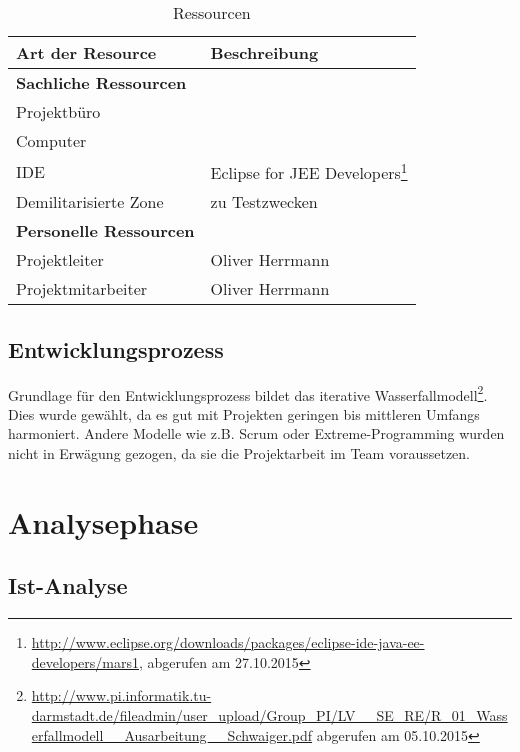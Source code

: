 \documentclass[12pt, xcolor=dvipsnames]{scrartcl}
\begin{document}
\begin{savenotes}
\begin{table}[H]
	\centering
	\begin{tabular}{ll}

		\rowcolor{white!15}				
		\textbf{Art der Resource} & \textbf{Beschreibung} \\\hline		
		
		\rowcolor{MidnightBlue!25}				
		\textbf{Sachliche Ressourcen} & \\
		Projektbüro & \\
		Computer & \\
		\hspace{1.5em} IDE & Eclipse for JEE Developers\footnote{\url{http://www.eclipse.org/downloads/packages/eclipse-ide-java-ee-developers/mars1}, abgerufen am 27.10.2015} \\
		Demilitarisierte Zone & zu Testzwecken \\
		
		\rowcolor{MidnightBlue!25}			
		\textbf{Personelle Ressourcen} & \\
		Projektleiter & Oliver Herrmann \\
		Projektmitarbeiter & Oliver Herrmann \\
	
			    
	\end{tabular}
	\caption{Ressourcen}
	\label{tab:ressourcen}
\end{table}
\end{savenotes}

\subsection{Entwicklungsprozess}

Grundlage für den Entwicklungsprozess bildet das iterative
Wasserfallmodell\footnote{\url{http://www.pi.informatik.tu-darmstadt.de/fileadmin/user_upload/Group_PI/LV__SE_RE/R_01_Wasserfallmodell__Ausarbeitung__Schwaiger.pdf} abgerufen am 05.10.2015}.
Dies wurde gewählt, da es gut mit Projekten geringen bis mittleren Umfangs harmoniert. Andere Modelle wie z.B. Scrum oder Extreme-Programming wurden nicht in Erwägung gezogen, da sie die Projektarbeit im Team voraussetzen.

\section{Analysephase}

\subsection{Ist-Analyse}
\end{document}

